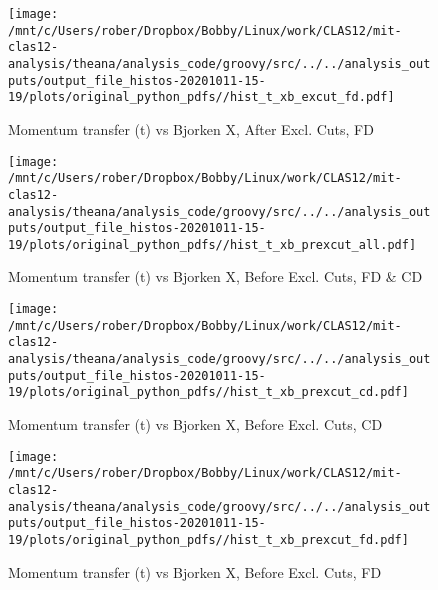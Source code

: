 \documentclass{article}
\begin{document}
\begin{landscape}
    \begin{figure}[h]
        \centering

        \texttt{[image: /mnt/c/Users/rober/Dropbox/Bobby/Linux/work/CLAS12/mit-clas12-analysis/theana/analysis\_code/groovy/src/../../analysis\_outputs/output\_file\_histos-20201011-15-19/plots/original\_python\_pdfs//hist\_t\_xb\_excut\_fd.pdf]}
        \captionsetup{textformat=empty,labelformat=blank}
        \caption{Momentum transfer (t) vs Bjorken X, After Excl. Cuts, FD}
    \end{figure}
    \clearpage
    
    \begin{figure}[h]
        \centering

        \texttt{[image: /mnt/c/Users/rober/Dropbox/Bobby/Linux/work/CLAS12/mit-clas12-analysis/theana/analysis\_code/groovy/src/../../analysis\_outputs/output\_file\_histos-20201011-15-19/plots/original\_python\_pdfs//hist\_t\_xb\_prexcut\_all.pdf]}
        \captionsetup{textformat=empty,labelformat=blank}
        \caption{Momentum transfer (t) vs Bjorken X, Before Excl. Cuts, FD \& CD}
    \end{figure}
    \clearpage
    
    \begin{figure}[h]
        \centering

        \texttt{[image: /mnt/c/Users/rober/Dropbox/Bobby/Linux/work/CLAS12/mit-clas12-analysis/theana/analysis\_code/groovy/src/../../analysis\_outputs/output\_file\_histos-20201011-15-19/plots/original\_python\_pdfs//hist\_t\_xb\_prexcut\_cd.pdf]}
        \captionsetup{textformat=empty,labelformat=blank}
        \caption{Momentum transfer (t) vs Bjorken X, Before Excl. Cuts, CD}
    \end{figure}
    \clearpage
    
    \begin{figure}[h]
        \centering

        \texttt{[image: /mnt/c/Users/rober/Dropbox/Bobby/Linux/work/CLAS12/mit-clas12-analysis/theana/analysis\_code/groovy/src/../../analysis\_outputs/output\_file\_histos-20201011-15-19/plots/original\_python\_pdfs//hist\_t\_xb\_prexcut\_fd.pdf]}
        \captionsetup{textformat=empty,labelformat=blank}
        \caption{Momentum transfer (t) vs Bjorken X, Before Excl. Cuts, FD}
    \end{figure}
    \clearpage
    
    \begin{figure}[h]
        \centering


\end{figure}
\end{landscape}
\end{document}
